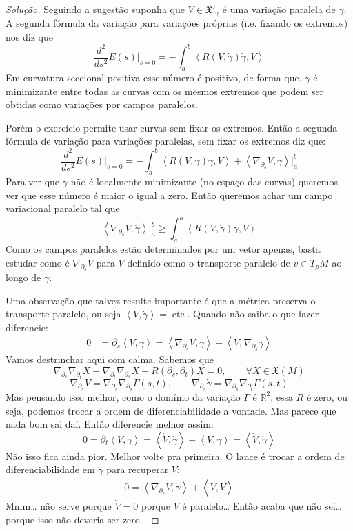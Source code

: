 \begin{proof}[Solução]\leavevmode
Seguindo a sugestão suponha que \(V \in \mathfrak{X}'_\gamma\) é uma variação paralela de \(\gamma\). A segunda fórmula da variação para variações próprias (i.e. fixando os extremos) nos diz que
\[\frac{d^2}{ds^2}E(s)\Big|_{s=0}=-\int_a^b \left<R(V,\dot \gamma)\dot \gamma,V\right>\]
Em curvatura seccional positiva esse número é positivo, de forma que, \(\gamma\) é minimizante entre todas as curvas com os mesmos extremos que podem ser obtidas como variações por campos paralelos.

Porém o exercício permite usar curvas sem fixar os extremos. Então a segunda fórmula de variação para variações paralelas, sem fixar os extremos diz que:
\[\frac{d^2}{ds^2}E(s)\Big|_{s=0}=-\int_a^b\left<R(V,\dot \gamma)\dot \gamma,V\right>+\left<\nabla_{\partial_s}V,\dot \gamma\right>|_{a}^b\]
Para ver que \(\gamma\) não é localmente minimizante (no espaço das curvas) queremos ver que esse número é maior o igual a zero. Então queremos achar um campo variacional paralelo tal que
\[\left<\nabla_{\partial_s}V,\dot \gamma\right>|_{a}^b \geq \int_a^b\left<R(V,\dot \gamma)\dot \gamma,V\right>\]
Como os campos paralelos estão determinados por um vetor apenas, basta estudar como é \(\nabla_{\partial_s}V\)  para \(V\) definido como o transporte paralelo de \(v \in T_pM\) ao longo de \(\gamma\).

Uma observação que talvez resulte importante é que a métrica preserva o transporte paralelo, ou seja \(\left<V,\dot \gamma\right>=\operatorname{cte}\). Quando não saiba o que fazer diferencie:
\begin{align*}
0&=\partial_s\left<V,\dot \gamma\right>=\left<\nabla_{\partial_s}V,\dot \gamma\right>+\left<V,\nabla_{\partial_s}\dot \gamma\right>
\end{align*}
Vamos destrinchar aqui com calma. Sabemos que
\[\nabla_{\partial_s}\nabla_{\partial_t}X - \nabla_{\partial_t}\nabla_{\partial_s}X-R(\partial_s,\partial_t)X=0,\qquad \forall X \in \mathfrak{X}(M)\]
\[\nabla_{\partial_s}V=\nabla_{\partial_s}\nabla_{\partial_s}\Gamma(s,t),\qquad \nabla_{\partial_s}\dot \gamma=\nabla_{\partial_s}\nabla_{\partial_t}\Gamma(s,t)\]
Mas pensando isso melhor, como o domínio da variação \(\Gamma\) é \(\mathbb{R}^2\), essa \(R\) é zero, ou seja, podemos trocar a ordem de diferenciabilidade a vontade. Mas parece que nada bom sai daí. Então diferencie melhor assim:
\[0=\partial_t\left<V,\dot \gamma\right>=\left<\dot V,\dot \gamma\right>+\left<V,\ddot \gamma\right>=\left<\dot V,\dot \gamma\right>\]
Não isso fica ainda pior. Melhor volte pra primeira. O lance é trocar a ordem de diferenciabilidade em \(\dot \gamma\) para recuperar \(V\):
\begin{align*}
0=\left<\nabla_{\partial_s}V,\dot \gamma\right>+\left<V,\dot V\right>
\end{align*}
Mmm… não serve porque \(\dot V=0\) porque \(V\) é paralelo… Então acaba que não sei… porque isso não deveria ser zero…


\end{proof}

